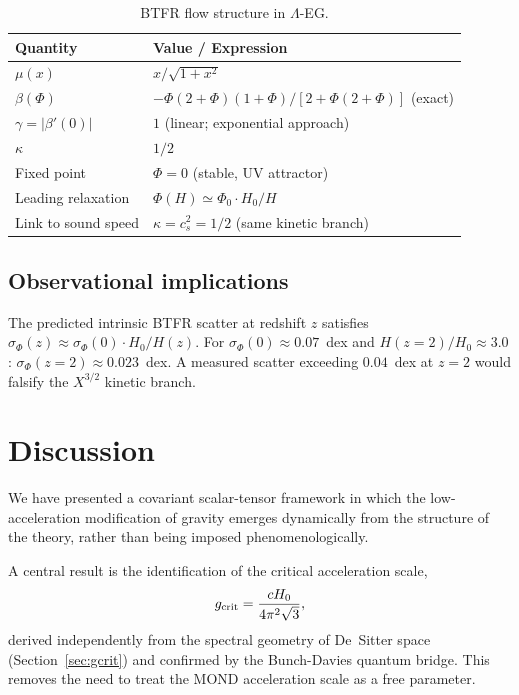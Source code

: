 \documentclass[11pt,a4paper]{article}
\begin{document}
\begin{table}[h]
\centering
\begin{tabular}{ll}
\toprule
Quantity & Value / Expression \\
\midrule
$\mu(x)$ & $x/\sqrt{1+x^2}$ \\
$\beta(\Phi)$ & $-\Phi(2{+}\Phi)(1{+}\Phi)/[2{+}\Phi(2{+}\Phi)]$ (exact) \\
$\gamma = |\beta'(0)|$ & $1$ (linear; exponential approach) \\
$\kappa$ & $1/2$ \\
Fixed point & $\Phi = 0$ (stable, UV attractor) \\
Leading relaxation & $\Phi(H)\simeq \Phi_0\cdot H_0/H$ \\
Link to sound speed & $\kappa = c_s^2 = 1/2$ (same kinetic branch) \\
\bottomrule
\end{tabular}
\caption{BTFR flow structure in $\Lambda$-EG.}
\label{tab:flow}
\end{table}

\subsection{Observational implications}
The predicted intrinsic BTFR scatter at redshift $z$ satisfies
$\sigma_\Phi(z) \approx \sigma_\Phi(0)\cdot H_0/H(z)$.
For $\sigma_\Phi(0)\approx 0.07$~dex and $H(z{=}2)/H_0\approx 3.0$:
$\sigma_\Phi(z{=}2)\approx 0.023$~dex.  A measured scatter exceeding
$0.04$~dex at $z=2$ would falsify the $X^{3/2}$ kinetic branch.

\section{Discussion}
\label{sec:discussion}

We have presented a covariant scalar-tensor framework in which the
low-acceleration modification of gravity emerges dynamically from the
structure of the theory, rather than being imposed phenomenologically.

A central result is the identification of the critical acceleration scale,
\begin{equation}
  g_{\rm crit} = \frac{cH_0}{4\pi^2\sqrt{3}},
\end{equation}
derived independently from the spectral geometry of De~Sitter space
(Section~\ref{sec:gcrit}) and confirmed by the Bunch-Davies quantum bridge.
This removes the need to treat the MOND acceleration scale as a free parameter.
\end{document}
